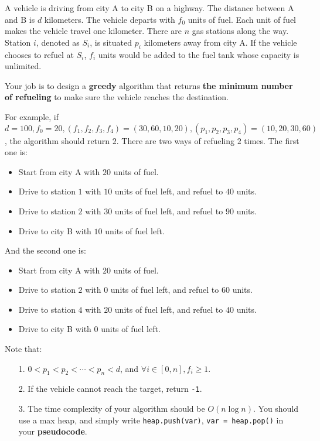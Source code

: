 
A vehicle is driving from city A to city B on a highway.
The distance between A and B is $d$ kilometers.
The vehicle departs with $f_0$ units of fuel.
Each unit of fuel makes the vehicle travel one kilometer.
There are $n$ gas stations along the way.
Station $i$, denoted as $S_i$, is situated $p_i$ kilometers away from city A\@.
If the vehicle chooses to refuel at $S_i$, $f_i$ units would be added to the fuel tank whose capacity is unlimited.

Your job is to design a \textbf{greedy} algorithm that returns \textbf{the minimum number of refueling} to make sure the vehicle reaches the destination.

For example, if $d=100, f_0=20, (f_1,f_2,f_3,f_4)=(30,60,10,20), (p_1,p_2,p_3,p_4)=(10,20,30,60)$, the algorithm should return $2$.
There are two ways of refueling $2$ times.
The first one is:
\begin{itemize}
    \item Start from city A with $20$ units of fuel.
    \item Drive to station $1$ with $10$ units of fuel left, and refuel to $40$ units.
    \item Drive to station $2$ with $30$ units of fuel left, and refuel to $90$ units.
    \item Drive to city B with $10$ units of fuel left.
\end{itemize}
And the second one is:
\begin{itemize}
    \item Start from city A with $20$ units of fuel.
    \item Drive to station $2$ with $0$ units of fuel left, and refuel to $60$ units.
    \item Drive to station $4$ with $20$ units of fuel left, and refuel to $40$ units.
    \item Drive to city B with $0$ units of fuel left.
\end{itemize}

Note that:
\begin{enumerate}
    \item[1.] $0<p_1<p_2<\cdots<p_n<d$, and $\forall i\in[0,n],f_i\ge 1$.
    \item[2.] If the vehicle cannot reach the target, return \texttt{-1}.
    \item[3.] The time complexity of your algorithm should be $O(n\log n)$.
        You should use a max heap, and simply write \lstinline{heap.push(var)}, \lstinline{var = heap.pop()} in your \textbf{pseudocode}.
\end{enumerate}


